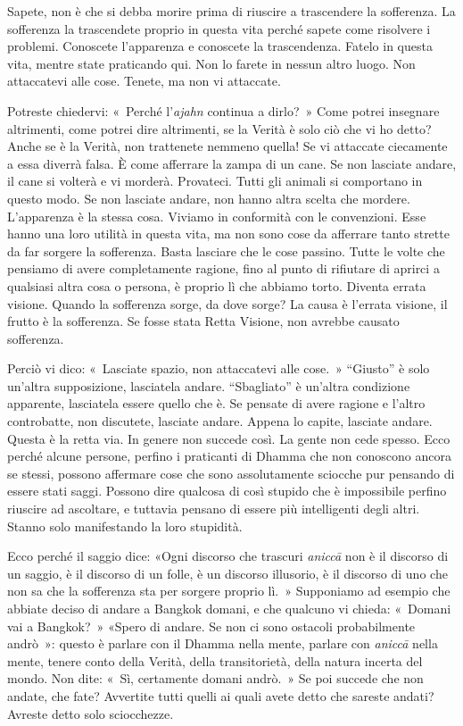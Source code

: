 Sapete, non è che si debba morire prima di riuscire a trascendere la
sofferenza. La sofferenza la trascendete proprio in questa vita perché
sapete come risolvere i problemi. Conoscete l'apparenza e conoscete la
trascendenza. Fatelo in questa vita, mentre state praticando qui. Non lo
farete in nessun altro luogo. Non attaccatevi alle cose. Tenete, ma non
vi attaccate.

Potreste chiedervi: «~Perché l'\emph{ajahn} continua a dirlo?~» Come
potrei insegnare altrimenti, come potrei dire altrimenti, se la Verità è
solo ciò che vi ho detto? Anche se è la Verità, non trattenete nemmeno
quella! Se vi attaccate ciecamente a essa diverrà falsa. È come
afferrare la zampa di un cane. Se non lasciate andare, il cane si
volterà e vi morderà. Provateci. Tutti gli animali si comportano in
questo modo. Se non lasciate andare, non hanno altra scelta che mordere.
L'apparenza è la stessa cosa. Viviamo in conformità con le convenzioni.
Esse hanno una loro utilità in questa vita, ma non sono cose da
afferrare tanto strette da far sorgere la sofferenza. Basta lasciare che
le cose passino. Tutte le volte che pensiamo di avere completamente
ragione, fino al punto di rifiutare di aprirci a qualsiasi altra cosa o
persona, è proprio lì che abbiamo torto. Diventa errata visione. Quando
la sofferenza sorge, da dove sorge? La causa è l'errata visione, il
frutto è la sofferenza. Se fosse stata Retta Visione, non avrebbe
causato sofferenza.

Perciò vi dico: «~Lasciate spazio, non attaccatevi alle cose.~»
``Giusto'' è solo un'altra supposizione, lasciatela andare.
``Sbagliato'' è un'altra condizione apparente, lasciatela essere quello
che è. Se pensate di avere ragione e l'altro controbatte, non discutete,
lasciate andare. Appena lo capite, lasciate andare. Questa è la retta
via. In genere non succede così. La gente non cede spesso. Ecco perché
alcune persone, perfino i praticanti di Dhamma che non conoscono ancora
se stessi, possono affermare cose che sono assolutamente sciocche pur
pensando di essere stati saggi. Possono dire qualcosa di così stupido
che è impossibile perfino riuscire ad ascoltare, e tuttavia pensano di
essere più intelligenti degli altri. Stanno solo manifestando la loro
stupidità.

Ecco perché il saggio dice: «Ogni discorso che trascuri \emph{aniccā}
non è il discorso di un saggio, è il discorso di un folle, è un discorso
illusorio, è il discorso di uno che non sa che la sofferenza sta per
sorgere proprio lì.~» Supponiamo ad esempio che abbiate deciso di andare
a Bangkok domani, e che qualcuno vi chieda: «~Domani vai a Bangkok?~»
«Spero di andare. Se non ci sono ostacoli probabilmente andrò~»: questo
è parlare con il Dhamma nella mente, parlare con \emph{aniccā} nella
mente, tenere conto della Verità, della transitorietà, della natura
incerta del mondo. Non dite: «~Sì, certamente domani andrò.~» Se poi
succede che non andate, che fate? Avvertite tutti quelli ai quali avete
detto che sareste andati? Avreste detto solo sciocchezze.

